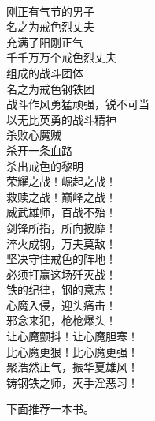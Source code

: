 \begin{poem}[戒色烈丈夫]
    \begin{multicols}{2}
        \begin{center}~\\
            刚正有气节的男子 \\ 名之为戒色烈丈夫 \\ 充满了阳刚正气 \\ 千千万万个戒色烈丈夫 \\ 组成的战斗团体 \\ 名之为戒色钢铁团 \\ 战斗作风勇猛顽强，锐不可当 \\ 以无比英勇的战斗精神 \\ 杀败心魔贼 \\ 杀开一条血路 \\ 杀出戒色的黎明 \\ 荣耀之战！崛起之战！ \\ 救赎之战！巅峰之战！ \\ 威武雄师，百战不殆！ \\ 剑锋所指，所向披靡！ \\ 淬火成钢，万夫莫敌！ \\ 坚决守住戒色的阵地！ \\ 必须打赢这场歼灭战！ \\ 铁的纪律，钢的意志！ \\ 心魔入侵，迎头痛击！ \\ 邪念来犯，枪枪爆头！ \\ 让心魔颤抖！让心魔胆寒！ \\ 比心魔更狠！比心魔更强！ \\ 聚浩然正气，振华夏雄风！ \\ 铸钢铁之师，灭手淫恶习！
        \end{center}
    \end{multicols}
\end{poem}

下面推荐一本书。

